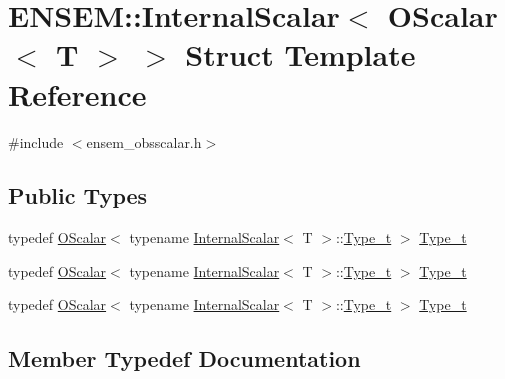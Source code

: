 \hypertarget{structENSEM_1_1InternalScalar_3_01OScalar_3_01T_01_4_01_4}{}\section{E\+N\+S\+EM\+:\+:Internal\+Scalar$<$ O\+Scalar$<$ T $>$ $>$ Struct Template Reference}
\label{structENSEM_1_1InternalScalar_3_01OScalar_3_01T_01_4_01_4}


{\ttfamily \#include $<$ensem\+\_\+obsscalar.\+h$>$}

\subsection*{Public Types}
\begin{DoxyCompactItemize}
\item 
typedef \mbox{\hyperlink{classENSEM_1_1OScalar}{O\+Scalar}}$<$ typename \mbox{\hyperlink{structENSEM_1_1InternalScalar}{Internal\+Scalar}}$<$ T $>$\+::\mbox{\hyperlink{structENSEM_1_1InternalScalar_3_01OScalar_3_01T_01_4_01_4_a9d07cdf2267bf23524d55f3626782f7c}{Type\+\_\+t}} $>$ \mbox{\hyperlink{structENSEM_1_1InternalScalar_3_01OScalar_3_01T_01_4_01_4_a9d07cdf2267bf23524d55f3626782f7c}{Type\+\_\+t}}
\item 
typedef \mbox{\hyperlink{classENSEM_1_1OScalar}{O\+Scalar}}$<$ typename \mbox{\hyperlink{structENSEM_1_1InternalScalar}{Internal\+Scalar}}$<$ T $>$\+::\mbox{\hyperlink{structENSEM_1_1InternalScalar_3_01OScalar_3_01T_01_4_01_4_a9d07cdf2267bf23524d55f3626782f7c}{Type\+\_\+t}} $>$ \mbox{\hyperlink{structENSEM_1_1InternalScalar_3_01OScalar_3_01T_01_4_01_4_a9d07cdf2267bf23524d55f3626782f7c}{Type\+\_\+t}}
\item 
typedef \mbox{\hyperlink{classENSEM_1_1OScalar}{O\+Scalar}}$<$ typename \mbox{\hyperlink{structENSEM_1_1InternalScalar}{Internal\+Scalar}}$<$ T $>$\+::\mbox{\hyperlink{structENSEM_1_1InternalScalar_3_01OScalar_3_01T_01_4_01_4_a9d07cdf2267bf23524d55f3626782f7c}{Type\+\_\+t}} $>$ \mbox{\hyperlink{structENSEM_1_1InternalScalar_3_01OScalar_3_01T_01_4_01_4_a9d07cdf2267bf23524d55f3626782f7c}{Type\+\_\+t}}
\end{DoxyCompactItemize}


\subsection{Member Typedef Documentation}
\mbox{\label{structENSEM_1_1InternalScalar_3_01OScalar_3_01T_01_4_01_4_a9d07cdf2267bf23524d55f3626782f7c}} 
